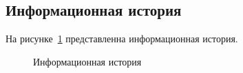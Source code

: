 \clearpage

\subsection{Информационная история}

На рисунке~\ref{fig:info_history} представленна информационная история.

\begin{figure}[h!]
	\caption{Информационная история}
	\label{fig:info_history}
\end{figure}





